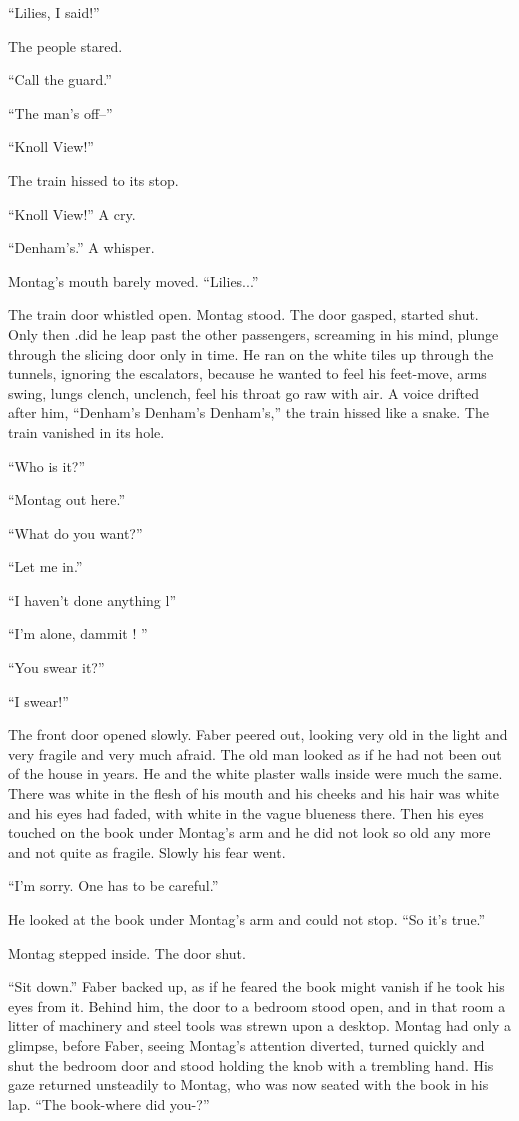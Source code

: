 \documentclass[11pt,openany]{book}
\begin{document}
``Lilies, I said!''

The people stared.

``Call the guard.''

``The man's off--''

``Knoll View!''

The train hissed to its stop.

``Knoll View!'' A cry.

``Denham's.'' A whisper.

Montag's mouth barely moved. ``Lilies...''

The train door whistled open. Montag stood. The door gasped, started shut. Only then .did he leap past the other passengers, screaming in his mind, plunge through the slicing door only in time. He ran on the white tiles up through the tunnels, ignoring the escalators, because he wanted to feel his feet-move, arms swing, lungs clench, unclench, feel his throat go raw with air. A voice drifted after him, ``Denham's Denham's Denham's,'' the train hissed like a snake. The train vanished in its hole.

``Who is it?''

``Montag out here.''

``What do you want?''

``Let me in.''

``I haven't done anything l''

``I'm alone, dammit ! ''

``You swear it?''

``I swear!''

The front door opened slowly. Faber peered out, looking very old in the light and very fragile and very much afraid. The old man looked as if he had not been out of the house in years. He and the white plaster walls inside were much the same. There was white in the flesh of his mouth and his cheeks and his hair was white and his eyes had faded, with white in the vague blueness there. Then his eyes touched on the book under Montag's arm and he did not look so old any more and not quite as fragile. Slowly his fear went.

``I'm sorry. One has to be careful.''

He looked at the book under Montag's arm and could not stop. ``So it's true.''

Montag stepped inside. The door shut.

``Sit down.'' Faber backed up, as if he feared the book might vanish if he took his eyes from it. Behind him, the door to a bedroom stood open, and in that room a litter of machinery and steel tools was strewn upon a desktop. Montag had only a glimpse, before Faber, seeing Montag's attention diverted, turned quickly and shut the bedroom door and stood holding the knob with a trembling hand. His gaze returned unsteadily to Montag, who was now seated with the book in his lap. ``The book-where did you-?''
\end{document}
